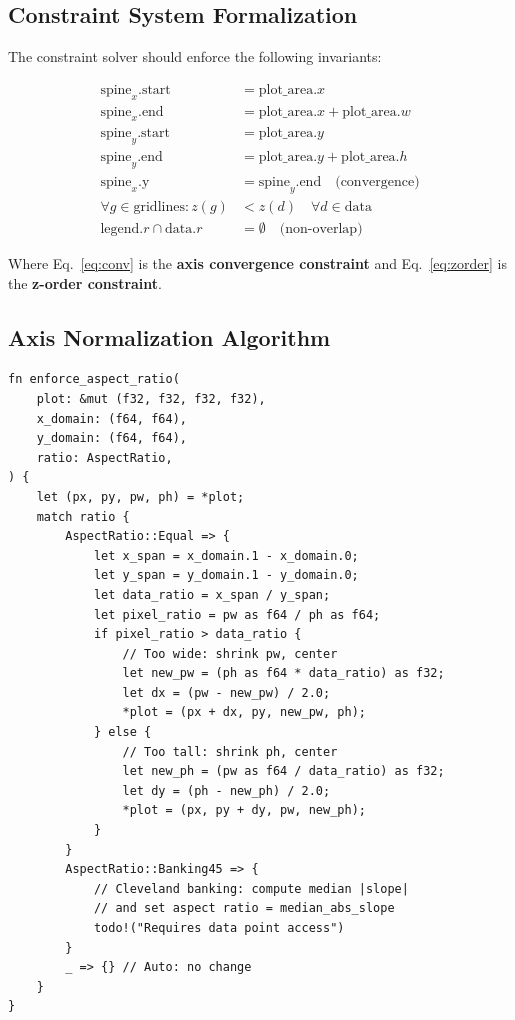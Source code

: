 \documentclass[11pt,a4paper]{article}
\begin{document}
\subsection{Constraint System Formalization}

The constraint solver should enforce the following invariants:

\begin{align}
\text{spine}_x.\text{start} &= \text{plot\_area}.x \label{eq:cx1} \\
\text{spine}_x.\text{end}   &= \text{plot\_area}.x + \text{plot\_area}.w \label{eq:cx2} \\
\text{spine}_y.\text{start} &= \text{plot\_area}.y \label{eq:cy1} \\
\text{spine}_y.\text{end}   &= \text{plot\_area}.y + \text{plot\_area}.h \label{eq:cy2} \\
\text{spine}_x.\text{y} &= \text{spine}_y.\text{end} \quad \text{(convergence)} \label{eq:conv} \\
\forall g \in \text{gridlines}: z(g) &< z(d) \quad \forall d \in \text{data} \label{eq:zorder} \\
\text{legend}.r \cap \text{data}.r &= \emptyset \quad \text{(non-overlap)} \label{eq:legend}
\end{align}

Where Eq.~\ref{eq:conv} is the \textbf{axis convergence constraint} and
Eq.~\ref{eq:zorder} is the \textbf{z-order constraint}.

\subsection{Axis Normalization Algorithm}

\begin{lstlisting}[title={Proposed aspect ratio enforcement}]
fn enforce_aspect_ratio(
    plot: &mut (f32, f32, f32, f32),
    x_domain: (f64, f64),
    y_domain: (f64, f64),
    ratio: AspectRatio,
) {
    let (px, py, pw, ph) = *plot;
    match ratio {
        AspectRatio::Equal => {
            let x_span = x_domain.1 - x_domain.0;
            let y_span = y_domain.1 - y_domain.0;
            let data_ratio = x_span / y_span;
            let pixel_ratio = pw as f64 / ph as f64;
            if pixel_ratio > data_ratio {
                // Too wide: shrink pw, center
                let new_pw = (ph as f64 * data_ratio) as f32;
                let dx = (pw - new_pw) / 2.0;
                *plot = (px + dx, py, new_pw, ph);
            } else {
                // Too tall: shrink ph, center
                let new_ph = (pw as f64 / data_ratio) as f32;
                let dy = (ph - new_ph) / 2.0;
                *plot = (px, py + dy, pw, new_ph);
            }
        }
        AspectRatio::Banking45 => {
            // Cleveland banking: compute median |slope|
            // and set aspect ratio = median_abs_slope
            todo!("Requires data point access")
        }
        _ => {} // Auto: no change
    }
}
\end{lstlisting}
\end{document}
